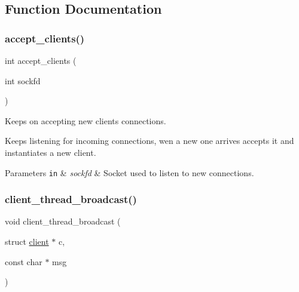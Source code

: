 \subsection{Function Documentation}
\mbox{\label{zip-zop-server_8c_acd1dc66d1afd8edcd165dc3f6855d355}} 
\subsubsection{\texorpdfstring{accept\+\_\+clients()}{accept\_clients()}}
{\footnotesize\ttfamily int accept\+\_\+clients (\begin{DoxyParamCaption}\item[{int}]{sockfd }\end{DoxyParamCaption})}



Keeps on accepting new clients connections. 

Keeps listening for incoming connections, wen a new one arrives accepts it and instantiates a new client.


\begin{DoxyParams}[1]{Parameters}
\mbox{\tt in}  & {\em sockfd} & Socket used to listen to new connections. \\
\hline
\end{DoxyParams}
\mbox{\label{zip-zop-server_8c_a3608e5c14908c59afe16bf1fc85895c9}} 
\subsubsection{\texorpdfstring{client\+\_\+thread\+\_\+broadcast()}{client\_thread\_broadcast()}}
{\footnotesize\ttfamily void client\+\_\+thread\+\_\+broadcast (\begin{DoxyParamCaption}\item[{struct \hyperlink{structclient}{client} $\ast$}]{c,  }\item[{const char $\ast$}]{msg }\end{DoxyParamCaption})}



